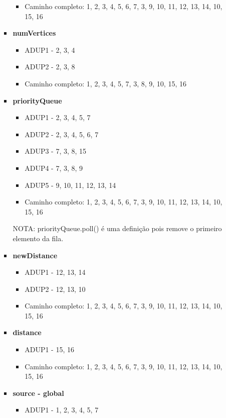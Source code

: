 \documentclass{article}
\begin{document}
\begin{itemize}
\begin{enumerate}
\begin{itemize}
\begin{itemize}
            \item Caminho completo: 1, 2, 3, 4, 5, 6, 7, 3, 9, 10, 11, 12, 13, 14, 10, 15, 16
        \end{itemize}
        \item \textbf{numVertices}
        \begin{itemize}
            \item ADUP1 - 2, 3, 4
            \item ADUP2 - 2, 3, 8
            \item Caminho completo: 1, 2, 3, 4, 5, 7, 3, 8, 9, 10, 15, 16
        \end{itemize}
        \item \textbf{priorityQueue}
        \begin{itemize}
            \item ADUP1 - 2, 3, 4, 5, 7
            \item ADUP2 - 2, 3, 4, 5, 6, 7
            \item ADUP3 - 7, 3, 8, 15
            \item ADUP4 - 7, 3, 8, 9
            \item ADUP5 - 9, 10, 11, 12, 13, 14
            \item Caminho completo:  1, 2, 3, 4, 5, 6, 7, 3, 9, 10, 11, 12, 13, 14, 10, 15, 16
        \end{itemize}
        NOTA: priorityQueue.poll() é uma definição pois remove o primeiro elemento da fila.
        \item \textbf{newDistance}
        \begin{itemize}
            \item ADUP1 - 12, 13, 14
            \item ADUP2 - 12, 13, 10
            \item Caminho completo: 1, 2, 3, 4, 5, 6, 7, 3, 9, 10, 11, 12, 13, 14, 10, 15, 16
        \end{itemize}
        \item \textbf{distance}
        \begin{itemize}
            \item ADUP1 - 15, 16
            \item Caminho completo: 1, 2, 3, 4, 5, 6, 7, 3, 9, 10, 11, 12, 13, 14, 10, 15, 16
        \end{itemize}
        \item \textbf{source - global}
        \begin{itemize}
            \item ADUP1 - 1, 2, 3, 4, 5, 7

\end{itemize}
\end{itemize}
\end{enumerate}
\end{itemize}
\end{document}

